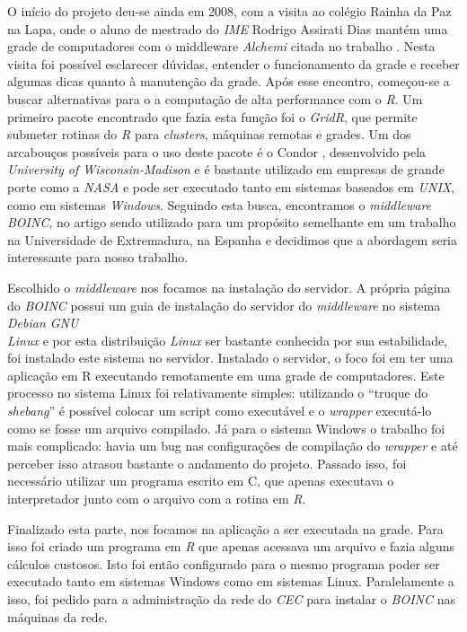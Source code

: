 
O início do projeto deu-se ainda em 2008, com a visita ao colégio Rainha da Paz na Lapa, onde o aluno de mestrado do \textit{IME}
Rodrigo Assirati Dias mantém uma grade de computadores com o middleware \textit{Alchemi} citada no trabalho %
. Nesta visita foi possível esclarecer dúvidas, entender o funcionamento da grade e receber algumas dicas quanto à manutenção da grade. 
Após esse encontro, começou-se a buscar alternativas para o a computação de alta performance com o \textit{R}. Um primeiro pacote encontrado
que fazia esta função foi o \textit{GridR}, que permite submeter rotinas do \textit{R} para \textit{clusters}, máquinas remotas e 
grades. Um dos arcabouços possíveis para o uso deste pacote é o Condor %
, desenvolvido pela \textit{University of Wisconsin-Madison} e é bastante utilizado em empresas
de grande porte como a \textit{NASA} e pode ser executado tanto em sistemas
baseados em \textit{UNIX}, como em sistemas \textit{Windows}. Seguindo esta busca, encontramos o 
\textit{middleware} \textit{BOINC}, no artigo %
sendo utilizado para um propósito semelhante em um trabalho na Universidade de Extremadura, na Espanha 
e decidimos que a abordagem seria interessante para nosso trabalho.

Escolhido o \textit{middleware} nos focamos na instalação do servidor. A própria página do \textit{BOINC} 
possui um guia de instalação do servidor do \textit{middleware} no sistema \textit{Debian GNU\\Linux} e por
esta distribuição \textit{Linux} ser bastante conhecida por sua estabilidade, foi instalado este sistema no servidor.
Instalado o servidor, o foco foi em ter uma aplicação em R executando remotamente em uma grade de computadores. 
Este processo no sistema Linux foi relativamente simples: utilizando o ``truque do \textit{shebang}'' é possível 
colocar um script como executável e o \textit{wrapper} executá-lo como se fosse um arquivo compilado. Já para
o sistema Windows %
o trabalho foi mais complicado: havia um bug nas configurações de compilação do \textit{wrapper} e até perceber isso
atrasou bastante o andamento do projeto. Passado isso, foi necessário utilizar um programa escrito em C, que apenas executava 
o interpretador junto com o arquivo com a rotina em \textit{R}.

Finalizado esta parte, nos focamos na aplicação a ser executada na grade. Para isso foi criado um programa em \textit{R} que
apenas acessava um arquivo e fazia alguns cálculos custosos. Isto foi então configurado para o mesmo programa poder
ser executado tanto em sistemas Windows como em sistemas Linux. Paralelamente a isso, foi pedido para a administração
da rede do \textit{CEC} para instalar o \textit{BOINC} nas máquinas da rede.


